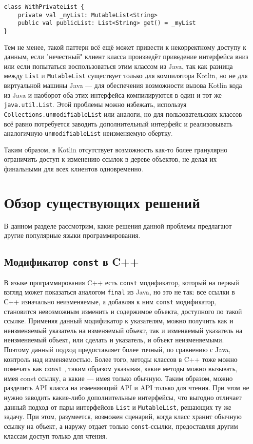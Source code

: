 \documentclass[specification,annotation,times]{itmo-student-thesis}
\begin{document}
\begin{lstlisting}[float=h!,caption={Backing property},label={backing_property}]
class WithPrivateList {
	private val _myList: MutableList<String>
	public val publicList: List<String> get() = _myList
}
\end{lstlisting}

Тем не менее, такой паттерн всё ещё может привести к некорректному доступу к данным, если "нечестный" клиент класса произведёт приведение интерфейса вниз или если попытаться воспользоваться этим классом из Java,
так как разница между \texttt{List} и \texttt{MutableList} существует только для компилятора Kotlin, но не для виртуальной машины Java --- для обеспечения возможности вызова Kotlin кода из Java и наоборот оба этих интерфейса компилируются в один и тот же \texttt{java.util.List}.
Этой проблемы можно избежать, используя \texttt{Collections.unmodifiableList} или аналоги, но для пользовательских классов всё равно потребуется заводить дополнительный интерфейс и реализовывать аналогичную \texttt{unmodifiableList} неизменяемую обертку.

Таким образом, в Kotlin отсутствует возможность как-то более гранулярно ограничить доступ к изменению ссылок в дереве объектов, не 
делая их финальными для всех клиентов одновременно.

\section{Обзор существующих решений}
\startrelatedwork

В данном разделе рассмотрим, какие решения данной проблемы предлагают другие популярные языки программирования.

\subsection{Модификатор \texttt{const} в C++}

В языке программирования C++ \cite{iso-cpp} есть \texttt{const} модификатор, который на первый взгляд может показаться аналогом \texttt{final} из Java, но это не так: все ссылки в С++ изначально неизменяемые, а добавляя к ним \texttt{const} модификатор, становится невозможным изменить и содержимое объекта, доступного по такой ссылке.
Применяя данный модификатор к указателям, можно получить как и неизменяемый указатель на изменяемый объект, так и изменяемый указатель на неизменяемый объект, или сделать и указатель, и объект неизменяемыми.
Поэтому данный подход предоставляет более точный, по сравнению с Java, контроль над изменяемостью.
Более того, методы классов в C++ тоже можно помечать как \texttt{const} \cite{cpp-const}, таким образом указывая, какие методы можно вызывать, имея const ссылку, а какие --- имея только обычную.
Таким образом, можно разделить API класса на изменяющий API и API только для чтения. При этом не нужно заводить какие-либо дополнительные интерфейсы, что выгодно отличает данный подход от пары интерфейсов \texttt{List} и \texttt{MutableList}, решающих ту же задачу.
При этом, разумеется, возможен сценарий, когда класс хранит обычную ссылку на объект, а наружу отдает только \texttt{const}-ссылки, предоставляя другим классам доступ только для чтения.
\end{document}
